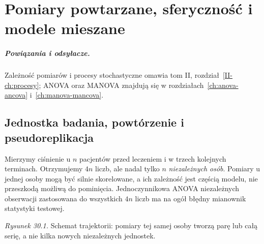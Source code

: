 \documentclass[11pt,a4paper,oneside]{report}
\numberwithin{equation}{chapter}
\theoremstyle{plain}
\theoremstyle{definition}
\theoremstyle{remark}
\begin{document}
\chapter{Pomiary powtarzane, sferyczność i modele mieszane}
\label{ch:repeated-measures}
\paragraph{Powiązania i odsyłacze.} Zależność pomiarów i procesy stochastyczne omawia tom II, rozdział~\ref{II-ch:procesy}; ANOVA oraz MANOVA znajdują się w rozdziałach~\ref{ch:anova-ancova} i~\ref{ch:manova-mancova}.


\section{Jednostka badania, powtórzenie i pseudoreplikacja}
Mierzymy ciśnienie u $n$ pacjentów przed leczeniem i w trzech kolejnych terminach. Otrzymujemy $4n$ liczb, ale nadal tylko $n$ \emph{niezależnych osób}. Pomiary u jednej osoby mogą być silnie skorelowane, a ich zależność jest częścią modelu, nie przeszkodą możliwą do pominięcia. Jednoczynnikowa ANOVA niezależnych obserwacji zastosowana do wszystkich $4n$ liczb ma na ogół błędny mianownik statystyki testowej.

\begin{center}

{\small\emph{Rysunek 30.1.} Schemat trajektorii: pomiary tej samej osoby tworzą parę lub całą serię, a nie kilka nowych niezależnych jednostek.}
\end{center}
\end{document}
